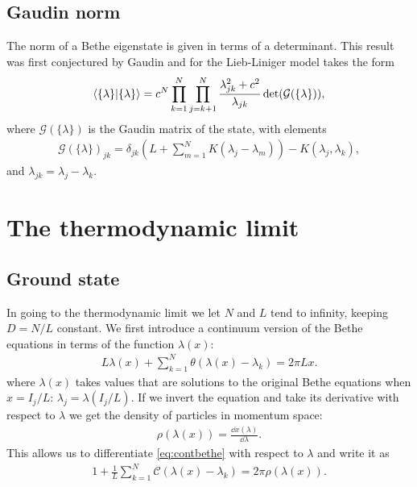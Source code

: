\documentclass[11pt, a4paper]{report} %
\begin{document}
\subsection{Gaudin norm}
The norm of a Bethe eigenstate is given in terms of a determinant.
This result was first conjectured by Gaudin and for the Lieb-Liniger model takes the form~\cite{Caux2007}
\begin{align}
  \braket{\{\lambda\}}{\{\lambda\}} = c^N \prod_{k=1}^N \prod_{j=k+1}^N \frac{\lambda_{jk}^2 + c^2}{\lambda_{jk}} \det(\mathcal{G}(\{\lambda\})),
\end{align}
where $\mathcal{G}(\{\lambda\})$ is the Gaudin matrix of the state, with elements
\begin{align}\label{eq:gaudin}
  \mathcal{G}(\{\lambda\})_{jk} = \delta_{jk} \left(L + \sum_{m=1}^{N}K(\lambda_j-\lambda_m)\right) - K(\lambda_j, \lambda_k),
\end{align}
and \(\lambda_{jk} = \lambda_j-\lambda_k\).


\section{The thermodynamic limit}
\subsection{Ground state}
In going to the thermodynamic limit we let \(N\) and \(L\) tend to infinity, keeping \(D=N/L\) constant.
We first introduce a continuum version of the Bethe equations in terms of the function \(\lambda(x)\):
\begin{align}
  \label{eq:contbethe}
  L \lambda(x) + \sum_{k=1}^N\theta(\lambda(x)-\lambda_k) = 2 \pi L x.
\end{align}
where \(\lambda(x)\) takes values that are solutions to the original Bethe equations when \(x=I_j/L\): \(\lambda_j=\lambda(I_j/L)\).
If we invert the equation and take its derivative with respect to \(\lambda\) we get the density of particles in momentum space:
\begin{align}
  \rho(\lambda(x)) = \frac{\dd x(\lambda)}{\dd \lambda}.
\end{align}
This allows us to differentiate \cref{eq:contbethe} with respect to \(\lambda\) and write it as 
\begin{align}
  1+\frac{1}{L} \sum_{k=1}^{N} \mathcal{C}(\lambda(x)- \lambda_k) = 2\pi \rho(\lambda(x)).
\end{align}
\end{document}
